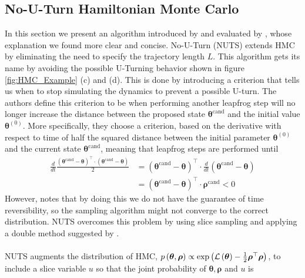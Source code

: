 \subsection{No-U-Turn Hamiltonian Monte Carlo}\label{sec:nuts}
In this section we present an algorithm introduced by \cite{hoffman2011nouturn} and evaluated by \cite{nishio_arakawa_nouturn}, whose explanation we found more clear and concise. No-U-Turn (NUTS) extends HMC by eliminating the need to specify the trajectory length $L$. This algorithm gets its name by avoiding the possible U-Turning behavior shown in figure \ref{fig:HMC_Example} (c) and (d). This is done by introducing a criterion that tells us when to stop simulating the dynamics to prevent a possible U-turn. The authors define this criterion to be when performing another leapfrog step will no longer increase the distance between the proposed state $\boldsymbol{\theta}^{\text{cand}}$ and the initial value $\boldsymbol{\theta}^{(0)}$. More specifically, they choose a criterion, based on the derivative with respect to time of half the squared distance between the initial parameter $\boldsymbol{\theta}^{(0)}$ and the current state $\boldsymbol{\theta}^{\text{cand}}$, meaning that leapfrog steps are performed until 
\begin{equation*}
\begin{split}
    \frac{d}{d t} \frac{(\boldsymbol{\theta}^{\text{cand}}-\boldsymbol{\theta})^\top \cdot(\boldsymbol{\theta}^{\text{cand}}-\boldsymbol{\theta})}{2}&=(\boldsymbol{\theta}^{\text{cand}}-\boldsymbol{\theta})^\top \cdot \frac{d}{d t}(\boldsymbol{\theta}^{\text{cand}}-\boldsymbol{\theta})\\
    &=(\boldsymbol{\theta}^{\text{cand}}-\boldsymbol{\theta})^\top \cdot \boldsymbol{\rho}^{\text{cand}} < 0
\end{split}
\end{equation*}
However, \cite{hoffman2011nouturn} notes that by doing this we do not have the guarantee of time reversibility, so the sampling algorithm might not converge to the correct distribution. NUTS overcomes this problem by using slice sampling and applying a double method suggested by \cite{neal_slice_sampling}. 
\\
\\
NUTS augments the distribution of HMC, $p \left (\boldsymbol{\theta}, \boldsymbol{\rho}\right) \propto \exp{\left(\mathcal{L} \left (\boldsymbol{\theta}\right) - \frac{1}{2} \boldsymbol{\rho}^\top \boldsymbol{\rho}\right)}$, to include a slice variable $u$ so that the joint probability of $\boldsymbol{\theta}, \boldsymbol{\rho}$ and $u$ is 
